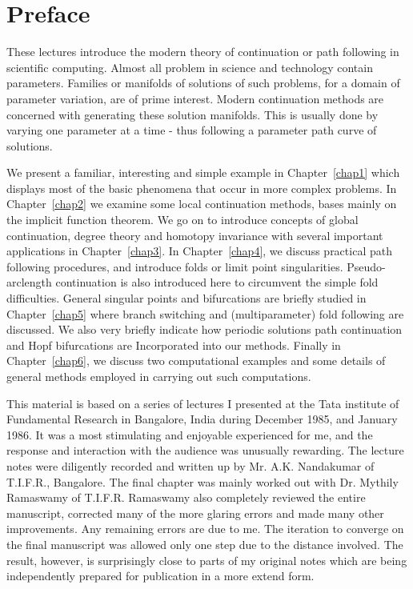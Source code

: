 \eject

\thispagestyle{empty}
\chapter*{Preface}


These lectures introduce the modern theory of continuation or path
following in scientific computing. Almost all problem in science and
technology contain parameters. Families or manifolds of solutions of
such problems, for a domain of parameter variation, are of prime
interest. Modern continuation methods are concerned with generating
these solution manifolds. This is usually done by varying one
parameter at a time - thus following a parameter path curve of
solutions.  

We present  a familiar, interesting and simple example in Chapter~\ref{chap1}
which displays most of the basic phenomena that occur in more complex
problems. In Chapter~\ref{chap2} we examine some local  continuation methods,
bases mainly on the implicit function theorem. We go on to introduce
concepts of global continuation, degree theory and homotopy invariance
with several important applications in Chapter~\ref{chap3}. In Chapter~\ref{chap4},
we discuss practical path following procedures, and introduce folds or
limit point singularities. Pseudo-arclength continuation is also
introduced  here to circumvent the simple fold difficulties. General
singular points and 
bifurcations are briefly studied in Chapter~\ref{chap5} where branch switching
and (multiparameter) fold following are discussed. We also very
briefly indicate how periodic solutions path continuation and Hopf
bifurcations are Incorporated into our methods. Finally in Chapter~\ref{chap6},
we discuss two computational examples and some details of general
methods employed in carrying out such computations.  

This material is based on a series of lectures I presented at the
Tata institute of Fundamental Research in Bangalore, India during
December 1985, and January 1986. It was a most stimulating and
enjoyable experienced for me, and  the response and interaction with
the audience was unusually rewarding. The lecture notes were
diligently recorded and written up by Mr. A.K. Nandakumar of T.I.F.R.,
Bangalore. The final chapter was mainly worked out with Dr. Mythily
Ramaswamy of T.I.F.R. Ramaswamy also completely reviewed the entire
manuscript, corrected many of the more glaring errors and made many
other improvements. Any remaining errors are due to me. The iteration
to converge on the final manuscript was allowed only one step due to
the distance involved. The result, however, is surprisingly close to
parts of my original notes which are being independently prepared for
publication in a more extend form.  

